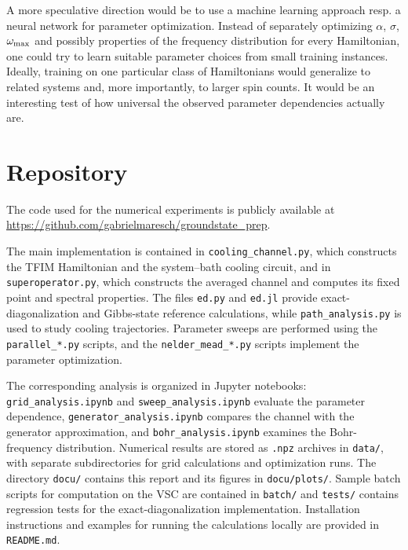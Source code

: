 \documentclass[12pt,a4paper]{article}
\begin{document}
A more speculative direction would be to use a machine learning approach resp. a neural network for parameter optimization. Instead of separately optimizing $\alpha$, $\sigma$, $\omega_{\rm max}$ and possibly properties of the frequency distribution for every Hamiltonian, one could try to learn suitable parameter choices from small training instances. Ideally, training on one particular class of Hamiltonians would generalize to related systems and, more importantly, to larger spin counts. It would be an interesting test of how universal the observed parameter dependencies actually are.

\newpage
\FloatBarrier
\section{Repository}
The code used for the numerical experiments is publicly available at \url{https://github.com/gabrielmaresch/groundstate_prep}.

The main implementation is contained in \texttt{cooling\_channel.py},
which constructs the TFIM Hamiltonian and the system--bath cooling
circuit, and in \texttt{superoperator.py}, which constructs the averaged
channel and computes its fixed point and spectral properties.
The files \texttt{ed.py} and \texttt{ed.jl} provide exact-diagonalization
and Gibbs-state reference calculations, while \texttt{path\_analysis.py}
is used to study cooling trajectories. Parameter sweeps are performed
using the \texttt{parallel\_*.py} scripts, and the
\texttt{nelder\_mead\_*.py} scripts implement the parameter optimization.

The corresponding analysis is organized in Jupyter notebooks:
\texttt{grid\_analysis.ipynb} and \texttt{sweep\_analysis.ipynb}
evaluate the parameter dependence, \texttt{generator\_analysis.ipynb}
compares the channel with the generator approximation, and
\texttt{bohr\_analysis.ipynb} examines the Bohr-frequency distribution.
Numerical results are stored as \texttt{.npz} archives in
\texttt{data/}, with separate subdirectories for grid calculations
and optimization runs. The directory \texttt{docu/} contains this
report and its figures in \texttt{docu/plots/}. Sample batch scripts for computation on the VSC are contained in 
\texttt{batch/} and
\texttt{tests/} contains regression tests for the
exact-diagonalization implementation. Installation instructions
and examples for running the calculations locally are provided in
\texttt{README.md}.

%
%
%
%
\end{document}
